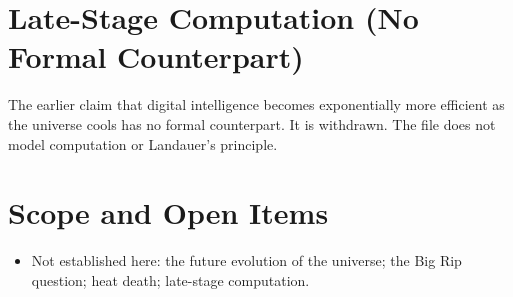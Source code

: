 \documentclass[11pt, a4paper]{article}
\begin{document}
\section{Late-Stage Computation (No Formal Counterpart)}
The earlier claim that digital intelligence becomes exponentially more efficient as the universe cools has no formal counterpart. It is withdrawn. The file does not model computation or Landauer's principle.

\section{Scope and Open Items}
\begin{itemize}
  \item Not established here: the future evolution of the universe; the Big Rip question; heat death; late-stage computation.
\end{itemize}
\end{document}

